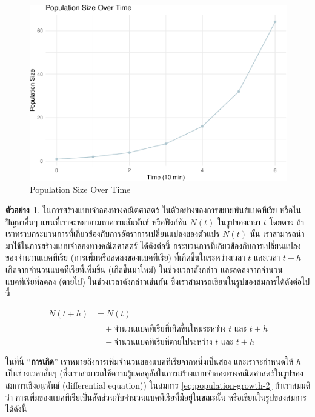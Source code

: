 \documentclass[
]{book}
\theoremstyle{definition}
\theoremstyle{definition}
\newtheorem{example}{ตัวอย่าง}[chapter]
\theoremstyle{definition}
\theoremstyle{definition}
\theoremstyle{remark}
\begin{document}
\begin{figure}
\centering
\includegraphics{SCMA104bookdownproj_files/figure-latex/population-plot-1.pdf}
\caption{\label{fig:population-plot}Population Size Over Time}
\end{figure}

\begin{example}
\protect\hypertarget{exm:exm2}{}\label{exm:exm2}ในการสร้างแบบจำลองทางคณิตศาสตร์ ในตัวอย่างของการขยายพันธ์แบคทีเรีย หรือในปัญหาอื่นๆ แทนที่เราจะพยายามหาความสัมพันธ์ หรือฟังก์ชัน \(N(t)\) ในรูปของเวลา \(t\) โดยตรง ถ้าเราทราบกระบวนการที่เกี่ยวข้องกับการอัตราการเปลี่ยนแปลงของตัวแปร \(N(t)\) นั้น เราสามารถนำมาใช้ในการสร้างแบบจำลองทางคณิตศาสตร์ ได้ดังต่อนี้ กระบวนการที่เกี่ยวข้องกับการเปลี่ยนแปลงของจำนวนแบคทีเรีย (การเพิ่มหรือลดลงของแบคทีเรีย) ที่เกิดขึ้นในระหว่างเวลา \(t\) และเวลา \(t + h\) เกิดจากจำนวนแบคทีเรียที่เพิ่มขึ้น (เกิดขึ้นมาใหม่) ในช่วงเวลาดังกล่าว และลดลงจากจำนวนแบคทีเรียที่ลดลง (ตายไป) ในช่วงเวลาดังกล่าวเช่นกัน ซึ่งเราสามารถเขียนในรูปของสมการได้ดังต่อไปนี้
\end{example}

\begin{equation}
   \begin{aligned}
      N(t + h) &= N(t) \\
               &\quad +     \text{จำนวนแบคทีเรียที่เกิดขึ้นใหม่ระหว่าง } t \text{ และ } t+h \\
              &\quad - \text{จำนวนแบคทีเรียที่ตายไประหว่าง } t \text{ และ } t+h
    \end{aligned}          
    \label{eq:population-growth-2}
\end{equation}

ในที่นี้ ``\textbf{การเกิด}'' เราหมายถึงการเพิ่มจำนวนของแบคทีเรียจากหนึ่งเป็นสอง และเราจะกำหนดให้ \(h\) เป็นช่วงเวลาสั้นๆ (ซึ่งเราสามารถใช้ความรู้แคลคูลัสในการสร้างแบบจำลองทางคณิตศาสตร์ในรูปของสมการเชิงอนุพันธ์ (differential equation)) ในสมการ \eqref{eq:population-growth-2} ถ้าเราสมมติว่า การเพิ่มของแบคทีเรียเป็นสัดส่วนกับจำนวนแบคทีเรียที่มีอยู่ในขณะนั้น หรือเขียนในรูปของสมการได้ดังนี้
\end{document}
